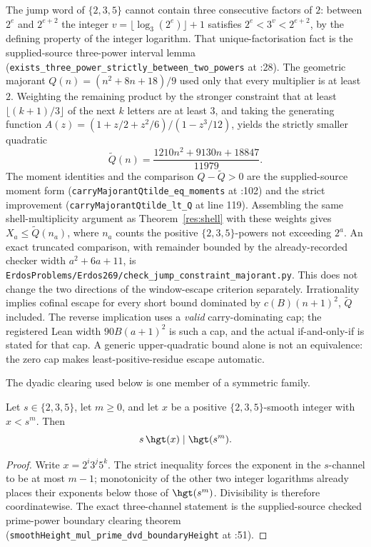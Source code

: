 The jump word of $\{2,3,5\}$ cannot contain three consecutive factors of $2$:
between $2^e$ and $2^{e+2}$ the integer $v=\lfloor\log_3(2^e)\rfloor+1$
satisfies $2^e<3^v<2^{e+2}$, by the defining property of the integer
logarithm.  That unique-factorisation fact is the supplied-source three-power interval
lemma (\texttt{exists\_three\_power\_strictly\_between\_two\_powers} at
:28).  The geometric majorant $Q(n)=(n^2+8n+18)/9$ used only that
every multiplier is at least $2$.  Weighting the remaining product by the
stronger constraint that at least $\lfloor(k+1)/3\rfloor$ of the next $k$
letters are at least $3$, and taking the generating function
$A(z)=(1+z/2+z^2/6)/(1-z^3/12)$, yields the strictly smaller quadratic
\[
 \widetilde Q(n)=\frac{1210n^2+9130n+18847}{11979}.
\]
The moment identities and the comparison $Q-\widetilde Q>0$ are the
supplied-source moment form
(\texttt{carryMajorantQtilde\_eq\_moments} at
:102) and the
strict improvement (\texttt{carryMajorantQtilde\_lt\_Q} at line 119).  Assembling the same shell-multiplicity argument as
Theorem~\ref{res:shell} with these weights gives $X_a\le\widetilde Q(n_a)$,
where $n_a$ counts the positive $\{2,3,5\}$-powers not exceeding $2^a$.  An
exact truncated comparison, with remainder bounded by the already-recorded
checker width $a^2+6a+11$, is
\texttt{ErdosProblems/Erdos269/check\_jump\_constraint\_majorant.py}.  This
does not change the two directions of the window-escape criterion
separately.  Irrationality implies cofinal escape for every short bound
dominated by $c(B)(n+1)^2$, $\widetilde Q$ included.  The reverse
implication uses a \emph{valid} carry-dominating cap; the registered
Lean width $90B(a+1)^2$ is such a cap, and the actual if-and-only-if is
stated for that cap.  A generic upper-quadratic bound alone is not an
equivalence: the zero cap makes least-positive-residue escape automatic.

The dyadic clearing used below is one member of a symmetric family.

\begin{theorem}\label{res:prime-power-boundary-clearing}
Let $s\in\{2,3,5\}$, let $m\ge0$, and let $x$ be a positive
$\{2,3,5\}$-smooth integer with $x<s^m$.  Then
\[
 s\,\hgt(x)\mid\hgt(s^m).
\]
\end{theorem}

\begin{proof}
Write $x=2^i3^j5^k$.  The strict inequality forces the exponent in the
$s$-channel to be at most $m-1$; monotonicity of the other two integer
logarithms already places their exponents below those of $\hgt(s^m)$.
Divisibility is therefore coordinatewise.  The exact three-channel statement
is the supplied-source checked prime-power boundary clearing theorem
(\texttt{smoothHeight\_mul\_prime\_dvd\_boundaryHeight} at
:51).
\end{proof}

